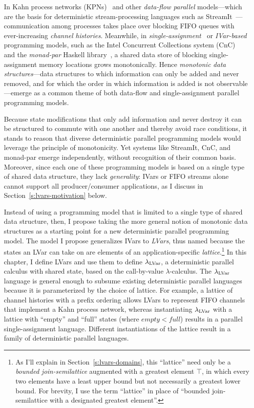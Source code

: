 In Kahn process networks (KPNs)~\cite{Kahn-1974} and other
\emph{data-flow parallel} models---which are the basis for
deterministic stream-processing languages such as
StreamIt~\cite{streamit-asplos}---communication among processes takes
place over blocking FIFO queues with ever-increasing \emph{channel
  histories}.  Meanwhile, in
\emph{single-assignment}~\cite{Tesler-1968} or
\emph{IVar-based}~\cite{IStructures} programming models, such as the
Intel Concurrent Collections system (CnC)~\cite{CnC} and the
\emph{monad-par} Haskell library~\cite{monad-par}, a shared data store
of blocking single-assignment memory locations grows monotonically.
Hence \emph{monotonic data structures}---data structures to which
information can only be added and never removed, and for which the
order in which information is added is not observable---emerge as a
common theme of both data-flow and single-assignment parallel
programming models.

Because state modifications that only add information and never
destroy it can be structured to commute with one another and thereby
avoid race conditions, it stands to reason that diverse deterministic
parallel programming models would leverage the principle of
monotonicity.  Yet systems like StreamIt, CnC, and monad-par emerge
independently, without recognition of their common basis.  Moreover,
since each one of these programming models is based on a single type
of shared data structure, they lack \emph{generality}: IVars or FIFO
streams alone cannot support all producer/consumer applications, as I
discuss in Section~\ref{s:lvars-motivation} below.

Instead of using a programming model that is limited to a single type
of shared data structure, then, I propose taking the more general
notion of monotonic data structures as a starting point for a new
deterministic parallel programming model.  The model I propose
generalizes IVars to \emph{LVars}, thus named because the states an
LVar can take on are elements of an
application-specific \emph{lattice}.\footnote{As I'll explain in
Section~\ref{s:lvars-domains}, this ``lattice'' need only be
a \emph{bounded join-semilattice} augmented with a greatest element
$\top$, in which every two elements have a least upper bound but not
necessarily a greatest lower bound.  For brevity, I use the term
``lattice'' in place of ``bounded join-semilattice with a designated
greatest element''.}  In this chapter, I define LVars and use them to
define $\lambda_{\textrm{LVar}}$, a deterministic parallel calculus with shared
state, based on the call-by-value $\lambda$-calculus.  The
$\lambda_{\textrm{LVar}}$ language is general enough to subsume existing
deterministic parallel languages because it is parameterized by the
choice of lattice.  For example, a lattice of channel histories with a
prefix ordering allows LVars to represent FIFO channels that implement
a Kahn process network, whereas instantiating $\lambda_{\textrm{LVar}}$ with a
lattice with ``empty'' and ``full'' states (where $\mathit{empty} <
\mathit{full}$) results in a parallel single-assignment language.
Different instantiations of the lattice result in a family of
deterministic parallel languages.

